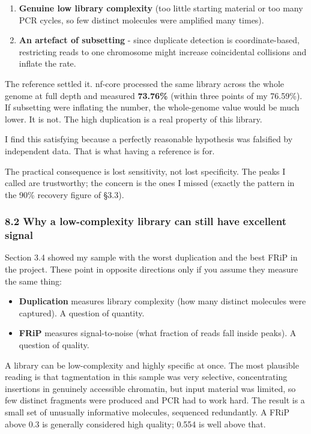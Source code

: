 \documentclass[
  11pt,
  a4paper,
]{article}
\providecommand{\tightlist}{%
  \setlength{\itemsep}{0pt}\setlength{\parskip}{0pt}}
\begin{document}
\begin{enumerate}
\def\labelenumi{\arabic{enumi}.}
\tightlist
\item
  \textbf{Genuine low library complexity} (too little starting material
  or too many PCR cycles, so few distinct molecules were amplified many
  times).
\item
  \textbf{An artefact of subsetting} - since duplicate detection is
  coordinate-based, restricting reads to one chromosome might increase
  coincidental collisions and inflate the rate.
\end{enumerate}

The reference settled it. nf-core processed the same library across the
whole genome at full depth and measured \textbf{73.76\%} (within three
points of my 76.59\%). If subsetting were inflating the number, the
whole-genome value would be much lower. It is not. The high duplication
is a real property of this library.

I find this satisfying because a perfectly reasonable hypothesis was
falsified by independent data. That is what having a reference is for.

The practical consequence is lost sensitivity, not lost specificity. The
peaks I called are trustworthy; the concern is the ones I missed
(exactly the pattern in the 90\% recovery figure of §3.3).

\hypertarget{why-a-low-complexity-library-can-still-have-excellent-signal}{%
\subsubsection{8.2 Why a low-complexity library can still have excellent
signal}\label{why-a-low-complexity-library-can-still-have-excellent-signal}}

Section 3.4 showed my sample with the worst duplication and the best
FRiP in the project. These point in opposite directions only if you
assume they measure the same thing:

\begin{itemize}
\tightlist
\item
  \textbf{Duplication} measures library complexity (how many distinct
  molecules were captured). A question of quantity.
\item
  \textbf{FRiP} measures signal-to-noise (what fraction of reads fall
  inside peaks). A question of quality.
\end{itemize}

A library can be low-complexity and highly specific at once. The most
plausible reading is that tagmentation in this sample was very
selective, concentrating insertions in genuinely accessible chromatin,
but input material was limited, so few distinct fragments were produced
and PCR had to work hard. The result is a small set of unusually
informative molecules, sequenced redundantly. A FRiP above 0.3 is
generally considered high quality; 0.554 is well above that.
\end{document}
